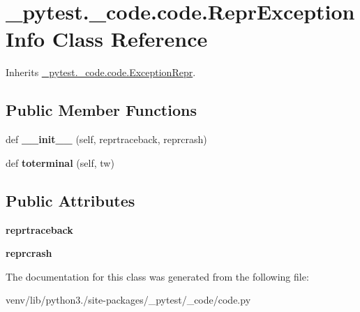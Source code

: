 \hypertarget{class__pytest_1_1__code_1_1code_1_1_repr_exception_info}{}\section{\+\_\+pytest.\+\_\+code.\+code.\+Repr\+Exception\+Info Class Reference}
\label{class__pytest_1_1__code_1_1code_1_1_repr_exception_info}


Inherits \hyperlink{class__pytest_1_1__code_1_1code_1_1_exception_repr}{\+\_\+pytest.\+\_\+code.\+code.\+Exception\+Repr}.

\subsection*{Public Member Functions}
\begin{DoxyCompactItemize}
\item 
\mbox{\label{class__pytest_1_1__code_1_1code_1_1_repr_exception_info_a828d212e4699c5a34693575650f8b5e8}} 
def {\bfseries \+\_\+\+\_\+init\+\_\+\+\_\+} (self, reprtraceback, reprcrash)
\item 
\mbox{\label{class__pytest_1_1__code_1_1code_1_1_repr_exception_info_a17bd8e8da686ccd292272405c1709e12}} 
def {\bfseries toterminal} (self, tw)
\end{DoxyCompactItemize}
\subsection*{Public Attributes}
\begin{DoxyCompactItemize}
\item 
\mbox{\label{class__pytest_1_1__code_1_1code_1_1_repr_exception_info_a935e5bd5984bf48635ebee950df0dd26}} 
{\bfseries reprtraceback}
\item 
\mbox{\label{class__pytest_1_1__code_1_1code_1_1_repr_exception_info_a92f551eef1a5d745611674403d5ab846}} 
{\bfseries reprcrash}
\end{DoxyCompactItemize}


The documentation for this class was generated from the following file\+:\begin{DoxyCompactItemize}
\item 
venv/lib/python3./site-\/packages/\+\_\+pytest/\+\_\+code/code.\+py\end{DoxyCompactItemize}
